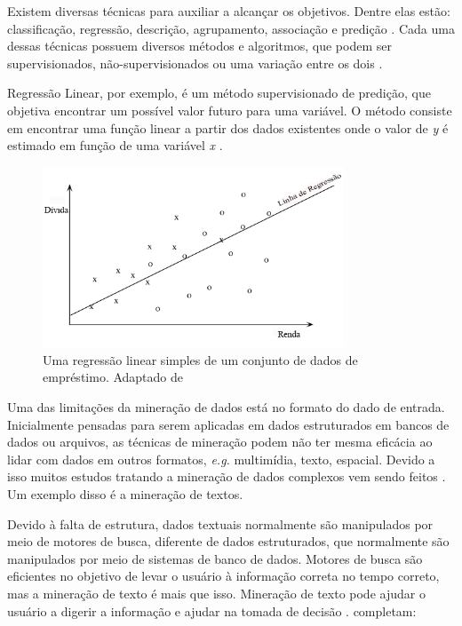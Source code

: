 Existem diversas técnicas para auxiliar a alcançar os objetivos. Dentre elas estão: classificação, regressão, descrição, agrupamento, associação e predição \cite{fayyad1996data}. Cada uma dessas técnicas possuem diversos métodos e algoritmos, que podem ser supervisionados, não-supervisionados ou uma variação entre os dois \cite{camilo2009mineraccao}.

Regressão Linear, por exemplo, é um método supervisionado de predição, que objetiva encontrar um possível valor futuro para uma variável. O método consiste em encontrar uma função linear a partir dos dados existentes onde o valor de \textit{y} é estimado em função de uma variável \textit{x} \cite{camilo2009mineraccao}.

\begin{figure}[h]
\centering
\includegraphics[width=0.8\textwidth]{img/linear-reg.png}
\caption{Uma regressão linear simples de um conjunto de dados de empréstimo. Adaptado de }
\label{fig:linear-reg}
\end{figure}

Uma das limitações da mineração de dados está no formato do dado de entrada. Inicialmente pensadas para serem aplicadas em dados estruturados em bancos de dados ou arquivos, as técnicas de mineração podem não ter mesma eficácia ao lidar com dados em outros formatos, \textit{e.g.} multimídia, texto, espacial. Devido a isso muitos estudos tratando a mineração de dados complexos vem sendo feitos \cite{camilo2009mineraccao}. Um exemplo disso é a mineração de textos.

Devido à falta de estrutura, dados textuais normalmente são manipulados por meio de motores de busca, diferente de dados estruturados, que normalmente são manipulados por meio de sistemas de banco de dados. Motores de busca são eficientes no objetivo de levar o usuário à informação correta no tempo correto, mas a mineração de texto é mais que isso. Mineração de texto pode ajudar o usuário a digerir a informação e ajudar na tomada de decisão \cite{aggarwal2012mining}.  completam:

